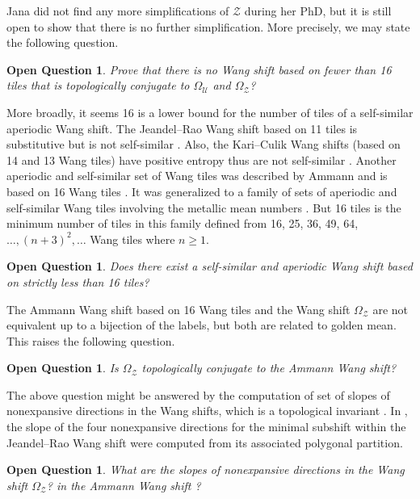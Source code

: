 \documentclass[12pt]{amsart}
\newtheorem{openquestion}[definition]{Open Question}
\newcommand{\Ucal}{\mathcal{U}}
\newcommand{\Zcal}{\mathcal{Z}}
\begin{document}
Jana did not find any more simplifications of $\Zcal$ during her PhD, but
it is still open to show that there is no further simplification.
More precisely, we may state the following question.

\begin{openquestion}
    Prove that there is no Wang shift based on fewer than 16 tiles
    that is topologically conjugate to $\Omega_\Ucal$ and $\Omega_\Zcal$?
\end{openquestion}

More broadly, it seems 16 is a lower bound for the number of tiles of a self-similar
aperiodic Wang shift. 
The Jeandel--Rao Wang shift based on 11 tiles is substitutive
but is not self-similar \cite{MR4226493}. 
Also, the Kari--Culik Wang shifts \cite{MR1417578,MR1417576} (based on 14 and
13 Wang tiles) have positive entropy thus are not self-similar \cite{MR3606059}.
Another aperiodic and self-similar set of Wang tiles was described by Ammann
and is based on 16 Wang tiles \cite{MR857454}. It was generalized to a family of sets of
aperiodic and self-similar Wang tiles involving the metallic mean numbers
\cite{labbe_metallic_I_2024,labbe_metallic_II_2024}. But 16 tiles is the minimum
number of tiles in this family defined from 16, 25, 36, 49, 64, $\ldots,
(n+3)^2, \ldots$ Wang tiles where $n\geq 1$.

\begin{openquestion}
    Does there exist a self-similar and aperiodic Wang shift
    based on strictly less than 16 tiles?
\end{openquestion}

The Ammann Wang shift based on 16 Wang tiles and the Wang shift $\Omega_\Zcal$
are not equivalent up to a bijection of the labels, but both are related to
golden mean. This raises the following question.

\begin{openquestion}
    Is $\Omega_\Zcal$ topologically conjugate to the Ammann Wang shift?
\end{openquestion}

The above question might be answered by the computation of set of slopes of
nonexpansive directions in the Wang shifts, which is a topological invariant
\cite{MR4730985}.
In \cite{MR4730985}, the slope of the four nonexpansive directions
for the minimal subshift within the Jeandel--Rao Wang shift were computed
from its associated polygonal partition.

\begin{openquestion}
    What are the slopes of nonexpansive directions in the Wang shift $\Omega_\Zcal$?
    in the Ammann Wang shift ?
\end{openquestion}
\end{document}
